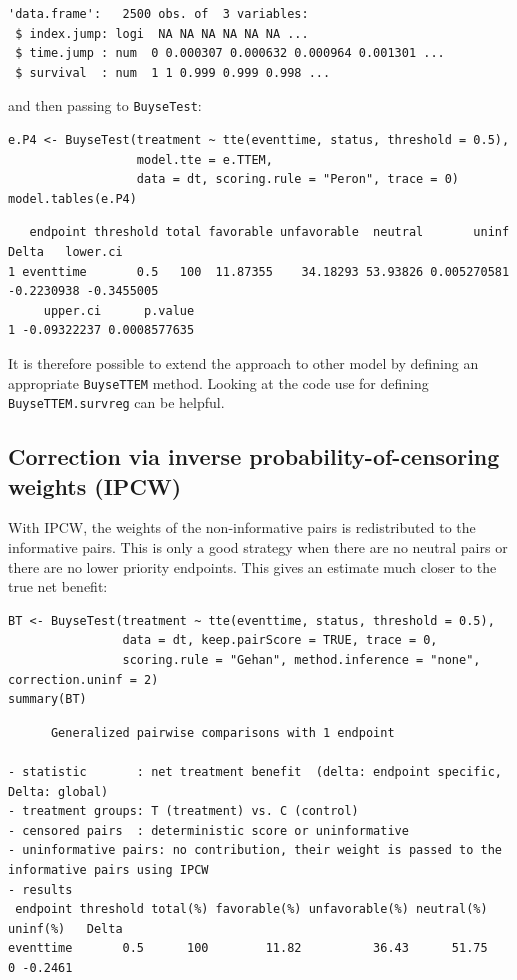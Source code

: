 \documentclass[12pt]{article}
\begin{document}
\begin{verbatim}
'data.frame':	2500 obs. of  3 variables:
 $ index.jump: logi  NA NA NA NA NA NA ...
 $ time.jump : num  0 0.000307 0.000632 0.000964 0.001301 ...
 $ survival  : num  1 1 0.999 0.999 0.998 ...
\end{verbatim}


and then passing to \texttt{BuyseTest}:
\lstset{language=r,label= ,caption= ,captionpos=b,numbers=none}
\begin{lstlisting}
e.P4 <- BuyseTest(treatment ~ tte(eventtime, status, threshold = 0.5),
                  model.tte = e.TTEM,
                  data = dt, scoring.rule = "Peron", trace = 0)
model.tables(e.P4)
\end{lstlisting}

\begin{verbatim}
   endpoint threshold total favorable unfavorable  neutral       uninf      Delta   lower.ci
1 eventtime       0.5   100  11.87355    34.18293 53.93826 0.005270581 -0.2230938 -0.3455005
     upper.ci      p.value
1 -0.09322237 0.0008577635
\end{verbatim}


It is therefore possible to extend the approach to other model by
defining an appropriate \texttt{BuyseTTEM} method. Looking at the code use
for defining \texttt{BuyseTTEM.survreg} can be helpful.

\subsection{Correction via inverse probability-of-censoring weights (IPCW)}
\label{sec:orgb3bb80d}

With IPCW, the weights of the non-informative pairs is redistributed
to the informative pairs. This is only a good strategy when there are
no neutral pairs or there are no lower priority endpoints. This gives
an estimate much closer to the true net benefit:
\lstset{language=r,label= ,caption= ,captionpos=b,numbers=none}
\begin{lstlisting}
BT <- BuyseTest(treatment ~ tte(eventtime, status, threshold = 0.5),
                data = dt, keep.pairScore = TRUE, trace = 0,
                scoring.rule = "Gehan", method.inference = "none", correction.uninf = 2)
summary(BT)
\end{lstlisting}

\begin{verbatim}
      Generalized pairwise comparisons with 1 endpoint

- statistic       : net treatment benefit  (delta: endpoint specific, Delta: global) 
- treatment groups: T (treatment) vs. C (control) 
- censored pairs  : deterministic score or uninformative
- uninformative pairs: no contribution, their weight is passed to the informative pairs using IPCW
- results
 endpoint threshold total(%) favorable(%) unfavorable(%) neutral(%) uninf(%)   Delta
eventtime       0.5      100        11.82          36.43      51.75        0 -0.2461
\end{verbatim}
\end{document}
